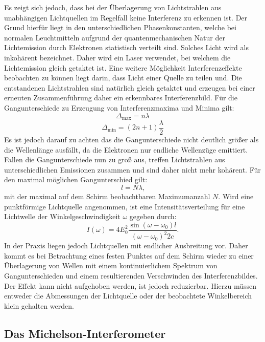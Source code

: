 Es zeigt sich jedoch, dass bei der Überlagerung von Lichtstrahlen aus unabhängigen
Lichtquellen im Regelfall keine Interferenz zu erkennen ist. Der Grund hierfür liegt
 in den unterschiedlichen Phasenkonstanten, welche bei normalen Leuchtmitteln aufgrund
 der quantenmechanischen Natur der Lichtemission durch Elektronen statistisch verteilt sind.
 Solches Licht wird als inkohärent bezeichnet. Daher wird ein Laser verwendet, bei welchem die Lichtemission gleich getaktet ist.
 Eine weitere Möglichkeit Interferenzeffekte beobachten zu können liegt darin, dass Licht einer Quelle zu teilen und.
 Die entstandenen Lichtstrahlen sind natürlich gleich getaktet und erzeugen bei einer erneuten Zusammenführung
 daher ein erkennbares Interferenzbild. Für die Gangunterschiede zu Erzeugung von Interferenzmaxima und Minima gilt:
 \begin{equation}
   \Delta_\text{max} = n \lambda
 \end{equation}
   \begin{equation}
   \Delta_\text{min} = \left(2 n+1\right)\frac{\lambda}{2}
 \end{equation}
Es ist jedoch darauf zu achten das die Gangunterschiede nicht deutlich größer als
die Wellenlänge ausfällt, da die Elektronen nur endliche Wellenzüge emittiert. Fallen
die Gangunterschiede nun zu groß aus, treffen Lichtstrahlen aus unterschiedlichen Emissionen
 zusammen und sind daher nicht mehr kohärent. Für den maximal möglichen Gangunterschied gilt:
 \begin{equation}
   l = N \lambda \text{,}
 \end{equation}
mit der maximal auf dem Schirm beobachtbaren Maximumanzahl $N$. Wird eine punktförmige
Lichtquelle angenommen, ist eine Intensitätsverteilung für eine Lichtwelle der Winkelgeschwindigkeit $\omega$ gegeben durch:
\begin{equation}
  I(\omega) = 4 E^2_0 \frac{\sin(\omega -\omega_0) l }{\left(\omega - \omega_0\right)^2 2 c}\text{.}
  \end{equation}
  In der Praxis liegen jedoch Lichtquellen mit endlicher Ausbreitung vor. Daher kommt es bei
  Betrachtung eines festen Punktes auf dem Schirm wieder zu einer Überlagerung von Wellen
  mit einem kontinuierlichem Spektrum von Gangunterschieden und einem resultierenden Verschwinden des Interferenzbildes.
  Der Effekt kann nicht aufgehoben werden, ist jedoch reduzierbar. Hierzu müssen entweder die Abmessungen der Lichtquelle
  oder der beobachtete Winkelbereich klein gehalten werden.

  \subsection{Das Michelson-Interferometer}



